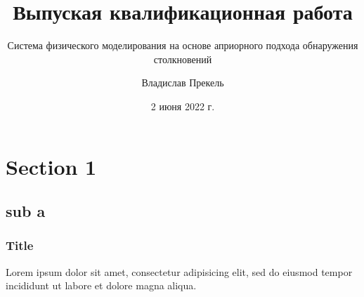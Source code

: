 \documentclass[xetex]{beamer}
\title{Выпуская квалификационная работа}
\subtitle{Система физического моделирования на основе априорного подхода обнаружения столкновений}
\author{Владислав Прекель}
\institute{ИКИТ СФУ}
\date{2 июня 2022 г.}
\begin{document}
\begin{frame}
    \titlepage
\end{frame}

\section{Section 1}
\subsection{sub a}

\begin{frame}
    \frametitle{Title}
    Lorem ipsum dolor sit amet, consectetur adipisicing elit, sed do eiusmod tempor incididunt ut labore et dolore magna aliqua.
\end{frame}
\end{document}
